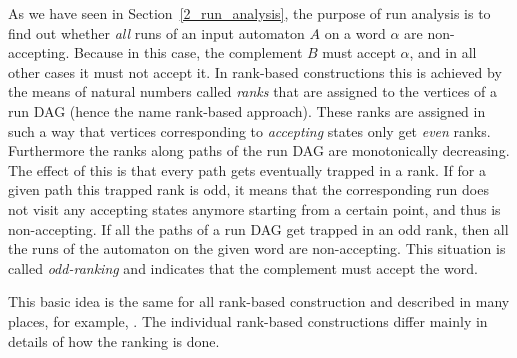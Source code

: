 As we have seen in Section~\ref{2_run_analysis}, the purpose of run analysis is to find out whether \textit{all} runs of an input automaton $A$ on a word $\alpha$ are non-accepting. Because in this case, the complement $B$ must accept $\alpha$, and in all other cases it must not accept it. In rank-based constructions this is achieved by the means of natural numbers called \textit{ranks} that are assigned to the vertices of a run DAG (hence the name rank-based approach). These ranks are assigned in such a way that vertices corresponding to \textit{accepting} states only get \textit{even} ranks. Furthermore the ranks along paths of the run DAG are monotonically decreasing. The effect of this is that every path gets eventually trapped in a rank. If for a given path this trapped rank is odd, it means that the corresponding run does not visit any accepting states anymore starting from a certain point, and thus is non-accepting. If all the paths of a run DAG get trapped in an odd rank, then all the runs of the automaton on the given word are non-accepting. This situation is called \textit{odd-ranking} and indicates that the complement must accept the word.

This basic idea is the same for all rank-based construction and described in many places, for example, \cite{fogarty2013unifying,Kupferman:2001,friedgut2006buchi,2007_vardi,2009_karmarkar,schewe2009buchi}. The individual rank-based constructions differ mainly in details of how the ranking is done.



